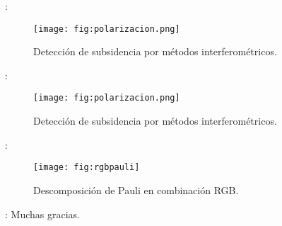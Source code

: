 \begin{frame}{\secname : \subsecname}
  \begin{figure}
    \centering
    \texttt{[image: fig:polarizacion.png]}
    \caption{Detección de subsidencia por métodos interferométricos.}
    \label{}
  \end{figure}
\end{frame}

\begin{frame}{\secname : \subsecname}
  \begin{figure}
    \centering
    \texttt{[image: fig:polarizacion.png]}
    \caption{Detección de subsidencia por métodos interferométricos.}
    \label{}
  \end{figure}
\end{frame}


\begin{frame}{\secname : \subsecname}
  \begin{figure}
    \centering
    \texttt{[image: fig:rgbpauli]}
    \caption{Descomposición de Pauli en combinación RGB.}
    \label{}
  \end{figure}
\end{frame}

\begin{frame}{\secname : \subsecname}
Muchas gracias.
\end{frame}
